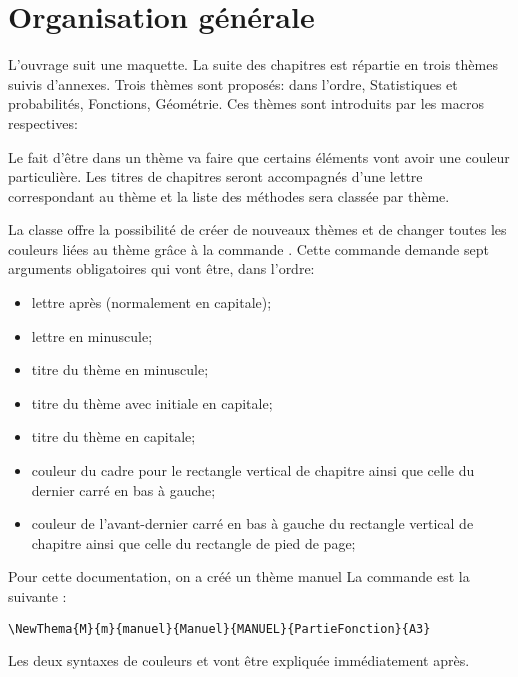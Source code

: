 \documentclass[nocrop]{sesamanuel}
\begin{document}
\section{Organisation générale}
\label{sec-organisation-generale}
\renewcommand{\StringDOCUMENTATION}{Principe}
\begin{documentation}
L'ouvrage suit une maquette. La suite des chapitres est répartie en
trois thèmes suivis d'annexes. Trois thèmes sont proposés: dans l'ordre, Statistiques et probabilités, Fonctions,
Géométrie. Ces thèmes sont introduits par les macros respectives:
  \begin{colenumerate}{3}
  \item {}
  \item {}
  \item {}
  \end{colenumerate}

Le fait d'être dans un thème va faire que certains éléments vont avoir
une couleur particulière. Les titres de chapitres seront accompagnés
d'une lettre correspondant au thème et la liste des méthodes sera
classée par thème.
\end{documentation}

\begin{methode*1}
La classe offre la possibilité de créer de nouveaux thèmes et de
changer toutes les couleurs liées au thème grâce à la commande
. Cette commande demande sept arguments obligatoires
qui vont être, dans l'ordre:
\begingroup
{}%
\begin{itemize}
\item lettre après  (normalement en capitale);
\item lettre en minuscule;
\item titre du thème en minuscule;
\item titre du thème avec initiale en capitale;
\item titre du thème en capitale;
\item couleur du cadre pour le rectangle vertical de chapitre ainsi
  que celle du dernier carré en bas à gauche;
\item couleur de l'avant-dernier carré en bas à gauche du rectangle
  vertical de chapitre ainsi que celle du rectangle de pied de page;
\end{itemize}
\endgroup
\exercice
Pour cette documentation, on a créé un thème 
\og manuel \fg{} 
\correction
La commande est la suivante :
\begin{verbatim}
\NewThema{M}{m}{manuel}{Manuel}{MANUEL}{PartieFonction}{A3}
\end{verbatim}
Les deux syntaxes de couleurs  et  vont
être expliquée immédiatement après.
\end{methode*1}
\end{document}
